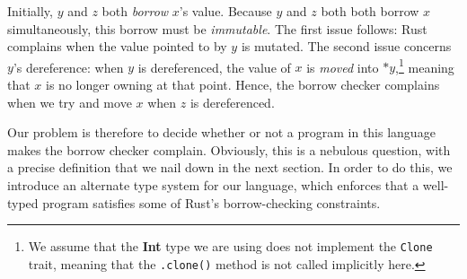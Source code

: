 \documentclass{article}
\newcommand{\mkref}{\textbf{ref}~}
\newcommand{\drfPth}{\mathbf{*}}
\newcommand{\parfun}{\rightharpoonup}
\begin{document}
Initially, $y$ and $z$ both \textit{borrow} $x$'s value. Because $y$ and $z$ both both borrow $x$ simultaneously, this borrow must be \textit{immutable}. The first issue follows: Rust complains when the value pointed to by $y$ is mutated. The second issue concerns $y$'s dereference: when $y$ is dereferenced, the value of $x$ is \textit{moved} into $\drfPth y$,\footnote{We assume that the \textbf{Int} type we are using does not implement the \texttt{Clone} trait, meaning that the \texttt{.clone()} method is not called implicitly here.} meaning that $x$ is no longer owning at that point. Hence, the borrow checker complains when we try and move $x$ when $z$ is dereferenced. 

Our problem is therefore to decide whether or not a program in this language makes the borrow checker complain. Obviously, this is a nebulous question, with a precise definition that we nail down in the next section. In order to do this, we introduce an alternate type system for our language, which enforces that a well-typed program satisfies some of Rust's borrow-checking constraints.




\end{document}

